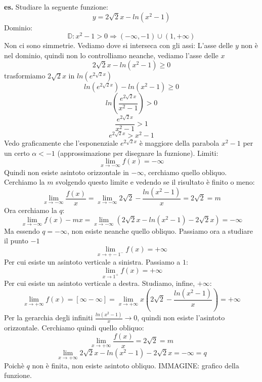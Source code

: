 \textbf{es.} Studiare la seguente funzione:
\[
    y = 2 \sqrt{2} x - ln(x^2-1)
\]
Dominio:
\[
    \mathbb{D}: x^2-1 > 0 \Rightarrow (- \infty, -1) \cup (1, + \infty)
\]
Non ci sono simmetrie.
\newline
Vediamo dove si interseca con gli assi:
\newline
L'asse delle $y$ non è nel dominio, quindi non lo controlliamo neanche, vediamo l'asse delle $x$
\[
    2 \sqrt{2}x - ln(x^2-1) \geq 0
\]
trasformiamo $2 \sqrt{2}x$ in $ln(e^{2 \sqrt{2}x})$
\[
    ln(e^{2 \sqrt{2}x}) - ln(x^2-1) \geq 0 
\]
\[
    ln (\frac{e^{2 \sqrt{2}x}}{x^2-1}) > 0
\]
\[
    \frac{e^{2 \sqrt{2}x}}{x^2-1} > 1
\]
\[
    e ^{2 \sqrt{2} x} > x^2-1
\]
Vedo graficamente che l'esponenziale $e ^{2 \sqrt{2} x}$ è maggiore della parabola $x^2-1$ per un certo $\alpha < -1$ (approssimazione per disegnare la fuznione).
\newline
Limiti:
\[
    \lim_{x\rightarrow - \infty} f(x) = - \infty
\]
Quindi non esiste asintoto orizzontale in $- \infty$, cerchiamo quello obliquo.
\newline
Cerchiamo la $m$ svolgendo questo limite e vedendo se il risultato è finito o meno:
\[
    \lim_{x\rightarrow -\infty} \frac{f(x)}{x} = \lim_{x\rightarrow -\infty} 2 \sqrt{2} - \frac{ln(x^2-1)}{x} = 2 \sqrt{2} = m
\]
Ora cerchiamo la $q$:
\[
    \lim_{x\rightarrow -\infty} f(x) - mx = \lim_{x\rightarrow -\infty} (2 \sqrt{2}x -ln (x^2-1) - 2 \sqrt{2}x) = -\infty
\]
Ma essendo $q = -\infty$, non esiste neanche quello obliquo.
\newline
Passiamo ora a studiare il punto $-1$
\[
    \lim_{x\rightarrow  + -1^-} f(x) = + \infty
\]
Per cui esiste un asintoto verticale a sinistra.
\newline
Passiamo a $1$:
\[
    \lim_{x\rightarrow 1^+}f(x) = + \infty
\]
Per cui esiste un asintoto verticale a destra.
\newline
Studiamo, infine, $+ \infty$:
\[
    \lim_{x\rightarrow +\infty} f(x) = [\infty- \infty] = \lim_{x\rightarrow + \infty} x (2 \sqrt{2} - \frac{ln(x^2-1)}{x})= + \infty
\]
Per la gerarchia degli infiniti $\frac{ln(x^2-1)}{x} \rightarrow 0$, quindi non esiste l'asintoto orizzontale.
\newline
Cerchiamo quindi quello obliquo:
\[
    \lim_{x\rightarrow + \infty} \frac{f(x)}{x} = 2 \sqrt{2} = m
\]
\[
    \lim_{x\rightarrow + \infty} 2 \sqrt{2}x - ln(x^2-1) - 2 \sqrt{2}x = - \infty = q
\]
Poichè $q$ non è finita, non esiste asintoto obliquo.
\newline
IMMAGINE: grafico della funzione.
\newline
